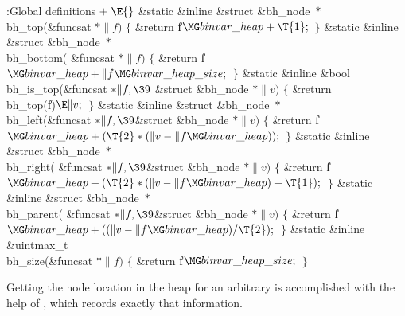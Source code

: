 \Y\B\4:Global definitions\X${}\mathrel+\E{}$\6
\&{static} \&{inline} \&{struct} \&{bh\_node} ${}{*}{}$\\{bh\_top}(\&{funcsat}
${}{*}\|f){}$\1\1\2\2\6
${}\{{}$\1\6
\&{return} \|f${}\MG\\{binvar\_heap}+\T{1};{}$\6
\4${}\}{}$\2\7
\&{static} \&{inline} \&{struct} \&{bh\_node} ${}{*}{}$\\{bh\_bottom}(%
\&{funcsat} ${}{*}\|f){}$\1\1\2\2\6
${}\{{}$\1\6
\&{return} \|f${}\MG\\{binvar\_heap}+\|f\MG\\{binvar\_heap\_size};{}$\6
\4${}\}{}$\2\7
\&{static} \&{inline} \&{bool} \\{bh\_is\_top}(\&{funcsat} ${}{*}\|f,\39{}$%
\&{struct} \&{bh\_node} ${}{*}\|v){}$\1\1\2\2\6
${}\{{}$\1\6
\&{return} \\{bh\_top}(\|f)${}\E\|v;{}$\6
\4${}\}{}$\2\7
\&{static} \&{inline} \&{struct} \&{bh\_node} ${}{*}{}$\\{bh\_left}(\&{funcsat}
${}{*}\|f,\39{}$\&{struct} \&{bh\_node} ${}{*}\|v){}$\1\1\2\2\6
${}\{{}$\1\6
\&{return} \|f${}\MG\\{binvar\_heap}+(\T{2}*(\|v-\|f\MG\\{binvar\_heap}));{}$\6
\4${}\}{}$\2\7
\&{static} \&{inline} \&{struct} \&{bh\_node} ${}{*}{}$\\{bh\_right}(%
\&{funcsat} ${}{*}\|f,\39{}$\&{struct} \&{bh\_node} ${}{*}\|v){}$\1\1\2\2\6
${}\{{}$\1\6
\&{return} \|f${}\MG\\{binvar\_heap}+(\T{2}*(\|v-\|f\MG\\{binvar\_heap})+%
\T{1});{}$\6
\4${}\}{}$\2\7
\&{static} \&{inline} \&{struct} \&{bh\_node} ${}{*}{}$\\{bh\_parent}(%
\&{funcsat} ${}{*}\|f,\39{}$\&{struct} \&{bh\_node} ${}{*}\|v){}$\1\1\2\2\6
${}\{{}$\1\6
\&{return} \|f${}\MG\\{binvar\_heap}+((\|v-\|f\MG\\{binvar\_heap})/\T{2});{}$\6
\4${}\}{}$\2\7
\&{static} \&{inline} \&{uintmax\_t} \\{bh\_size}(\&{funcsat} ${}{*}\|f){}$\1\1%
\2\2\6
${}\{{}$\1\6
\&{return} \|f${}\MG\\{binvar\_heap\_size};{}$\6
\4${}\}{}$\2\par
\fi

Getting the node location in the heap for an arbitrary 
is
accomplished with the help of , which records
exactly that
information.

